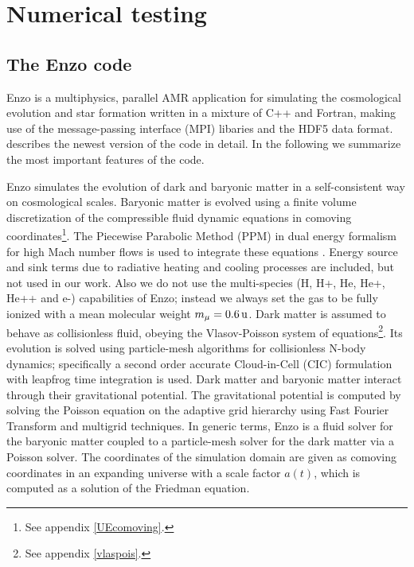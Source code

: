 \chapter{Numerical testing}\label{numtest}
\section{The Enzo code}
Enzo is a multiphysics, parallel AMR application for simulating the
cosmological evolution and star formation written in a mixture of C++ and
Fortran, making use of the message-passing interface (MPI) libaries and the 
HDF5 data format. \citet{Norman2007} describes the newest version of the code in
detail. In the following we summarize the most important features of the code.

Enzo simulates the evolution of dark and baryonic matter in a self-consistent
way on cosmological scales. Baryonic matter is evolved using a finite volume
discretization of the compressible fluid dynamic equations in comoving
coordinates\footnote{See appendix \ref{UEcomoving}.}. The Piecewise Parabolic
Method (PPM) in dual energy formalism for high Mach number flows is used to
integrate these equations \citep{Bryan1995}. Energy source and
sink terms due to
radiative heating and cooling processes are included, but not used in our work.
Also we do not use the multi-species (H, H+, He, He+, He++ and e-) capabilities
of Enzo; instead we always set the gas to be fully ionized with a mean
molecular
weight $m_{\mu}= \unit[0.6]{u}$. Dark matter is assumed to behave as
collisionless fluid, obeying the Vlasov-Poisson system of
equations\footnote{See appendix \ref{vlaspois}.}. Its evolution is
solved using particle-mesh algorithms for collisionless N-body dynamics;
specifically a second order accurate Cloud-in-Cell (CIC) formulation with
leapfrog time integration is used. Dark matter and baryonic matter interact
through their
gravitational potential. The gravitational potential is computed by solving the
Poisson equation on the adaptive grid hierarchy using Fast Fourier Transform and
multigrid techniques. In generic terms, Enzo is a fluid solver for the baryonic
matter coupled to a particle-mesh solver for the dark matter via a Poisson
solver. The coordinates of the simulation domain are given as comoving
coordinates in an expanding universe with a scale factor $a(t)$, which is
computed as a solution of the Friedman equation.

